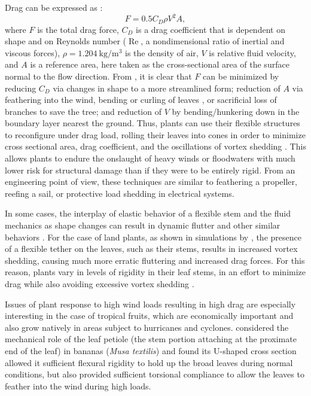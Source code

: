 Drag can be expressed as \citep{kundu2012fluid}:
\begin{equation}
F=0.5 C_D \rho V^2 A,
\label{eq:drag}
\end{equation}
where $F$ is the total drag force, $C_D$ is a drag coefficient that is dependent on shape and on Reynolds number ($\operatorname{Re}$, a nondimensional ratio of inertial and viscous forces), $\rho=\SI{1.204}{\kilo\gram\per\meter\cubed}$ is the density of air, $V$ is relative fluid velocity, and $A$ is a reference area, here taken as the cross-sectional area of the surface normal to the flow direction. From , it is clear that $F$ can be minimized by reducing $C_D$ via changes in shape to a more streamlined form; reduction of $A$ via feathering into the wind, bending or curling of leaves \citep{ennos2000functional}, or sacrificial loss of branches to save the tree; and reduction of $V$ by bending/hunkering down in the boundary layer nearest the ground. Thus, plants can use their flexible structures to reconfigure under drag load, rolling their leaves into cones in order to minimize cross sectional area, drag coefficient, and the oscillations of vortex shedding \citep{miller2012reconfiguration, vogel1989drag, ennos2000functional}. This allows plants to endure the onslaught of heavy winds or floodwaters with much lower risk for structural damage than if they were to be entirely rigid. From an engineering point of view, these techniques are similar to feathering a propeller, reefing a sail, or protective load shedding in electrical systems.

In some cases, the interplay of elastic behavior of a flexible stem and the fluid mechanics as shape changes can result in dynamic flutter and other similar behaviors \citep{miller2012reconfiguration, boller2007interspecific, denny2002mechanics}. For the case of land plants, as shown in simulations by \citet{miller2012reconfiguration}, the presence of a flexible tether on the leaves, such as their stems, results in increased vortex shedding, causing much more erratic fluttering and increased drag forces. For this reason, plants vary in levels of rigidity in their leaf stems, in an effort to minimize drag while also avoiding excessive vortex shedding \citep{miller2012reconfiguration, vogel2009leaves}. 
    
Issues of plant response to high wind loads resulting in high drag are especially interesting in the case of tropical fruits, which are economically important and also grow natively in areas subject to hurricanes and cyclones. \citet{ennos2000functional} considered the mechanical role of the leaf petiole (the stem portion attaching at the proximate end of the leaf) in bananas (\emph{Musa textilis}) and found its U-shaped cross section allowed it sufficient flexural rigidity to hold up the broad leaves during normal conditions, but also provided sufficient torsional compliance to allow the leaves to feather into the wind during high loads. 
    
